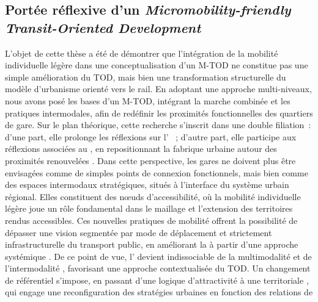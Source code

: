 \begin{refsegment}
\section*{Portée réflexive d'un \textsl{Micromobility-friendly Transit-Oriented Development}
    \label{conclusion-generale:portee-reflexive-mtod}
    }

L’objet de cette thèse a été de démontrer que l’intégration de la mobilité individuelle légère dans une conceptualisation d'un \acrfull{M-TOD} ne constitue pas une simple amélioration du \acrfull{TOD}, mais bien une transformation structurelle du modèle d’urbanisme orienté vers le rail. En adoptant une approche multi-niveaux, nous avons posé les bases d’un \acrshort{M-TOD}, intégrant la marche combinée et les pratiques intermodales, afin de redéfinir les proximités fonctionnelles des quartiers de gare. Sur le plan théorique, cette recherche s’inscrit dans une double filiation~: d’une part, elle prolonge les réflexions sur l’ \textcolor{blue}{\autocite[]{dupuy_urbanisme_1991}}~; d’autre part, elle participe aux réflexions associées au , en repositionnant la fabrique urbaine autour des proximités renouvelées \textcolor{blue}{\autocites{sheller_new_2006}[8]{sheller_mobilizing_2016}[13]{randell_no_2020}}. Dans cette perspective, les gares ne doivent plus être envisagées comme de simples points de connexion fonctionnels, mais bien comme des espaces intermodaux stratégiques, situés à l’interface du système urbain régional. Elles constituent des nœuds d’accessibilité, où la mobilité individuelle légère joue un rôle fondamental dans le maillage et l’extension des territoires rendus accessibles. Ces nouvelles pratiques de mobilité offrent la possibilité de dépasser une vision segmentée par mode de déplacement et strictement infrastructurelle du transport public, en améliorant la  \textcolor{blue}{\autocite[15]{richer_quelles_2016}} à partir d'une approche systémique . De ce point de vue, l’ devient indissociable de la \gls{multimodalité} et de l’intermodalité \textcolor{blue}{\autocite[91-92]{vincent-geslin__2012}}, favorisant une approche contextualisée du \acrshort{TOD}. Un changement de référentiel s’impose, en passant d'une logique d'attractivité à une  territoriale \textcolor{blue}{\autocite[2]{talandier_lhospitalite_2023}}, qui engage une reconfiguration des stratégies urbaines en fonction des relations de 
\end{refsegment}
